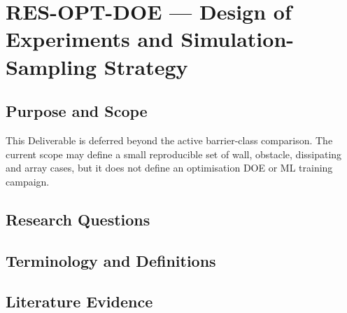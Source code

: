 
\section{RES-OPT-DOE --- Design of Experiments and Simulation-Sampling Strategy}
\label{sec:res-opt-doe}

\subsection{Purpose and Scope}
\label{sec:res-opt-doe-purpose}

This Deliverable is deferred beyond the active barrier-class
comparison. The current scope may define a small reproducible set of
wall, obstacle, dissipating and array cases, but it does not define an
optimisation DOE or ML training campaign.

\subsection{Research Questions}
\label{sec:res-opt-doe-research-questions}


\subsection{Terminology and Definitions}
\label{sec:res-opt-doe-definitions}


\subsection{Literature Evidence}
\label{sec:res-opt-doe-literature-evidence}

%

